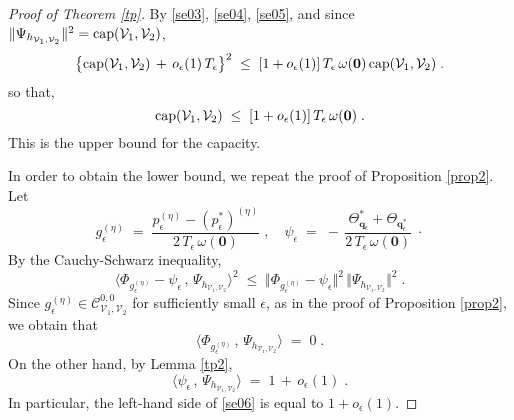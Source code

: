 \documentclass[reqno]{amsart}
\newcounter{as}[section]
\newcommand{\mc}[1]{{\mathcal #1}}
\newcommand{\bs}[1]{{\boldsymbol #1}}
\newcommand{\<}{\langle}
\renewcommand{\>}{\rangle}
\begin{document}
\begin{proof}[Proof of Theorem \ref{tp}]
By \eqref{se03}, \eqref{se04}, \eqref{se05}, and since $\Vert
\Psi_{h_{\mc{V}_{1},\mc{V}_{2}}} \Vert ^{2} =
\textup{cap}(\mc{V}_{1},\mc{V}_{2})$,
\begin{equation*}
\big\{ \textup{cap}(\mc{V}_{1},\mc{V}_{2}) \,+\,
o_{\epsilon}(1) \, T_{\epsilon}\big\}^{2} \;\le\;
[1+o_{\epsilon}(1)] \,T_{\epsilon} \,\omega(\bs{0})
\,\textup{cap}(\mc{V}_{1},\mc{V}_{2})\;.
\end{equation*}
so that,
\begin{equation*}
\textup{cap}(\mc{V}_{1},\mc{V}_{2})
\;\le\; [1+o_{\epsilon}(1)] \,T_{\epsilon}\, \omega(\bs{0})\;.
\end{equation*}
This is the upper bound for the capacity.

In order to obtain the lower bound, we repeat the proof of Proposition
\ref{prop2}. Let
\begin{equation*}
g_{\epsilon}^{(\eta)} \;=\;
\frac{p_{\epsilon}^{(\eta)}-(p_{\epsilon}^{*})^{(\eta)}}
{2\,T_{\epsilon}\,\omega(\bs{0})}\;,
\quad \psi_{\epsilon}\;=\; -\,
\frac{\Theta_{\bs{q}_{\epsilon}}^{*}+\Theta_{\bs{q}_{\epsilon}^{*}}}
{2\,T_{\epsilon}\,\omega(\bs{0})}\;\cdot
\end{equation*}
By the Cauchy-Schwarz inequality,
\begin{equation}
\label{se06}
\big\langle \Phi_{g_{\epsilon}^{(\eta)}} -\psi_{\epsilon} \,,\,
\Psi_{h_{\mc{V}_{1},\mc{V}_{2}}}\big\rangle ^{2}
\;\le\; \big\Vert \Phi_{g_{\epsilon}^{(\eta)}}
-\psi_{\epsilon} \big\Vert ^{2} \,
\Vert \Psi_{h_{\mc{V}_{1},\mc{V}_{2}}} \Vert ^{2}\;.
\end{equation}
Since $g_{\epsilon}^{(\eta)}\in\mc{C}_{\mc{V}_{1},\mc{V}_{2}}^{0,0}$ for
sufficiently small $\epsilon$, as in the proof of Proposition
\ref{prop2}, we obtain that
\begin{equation*}
\big\langle \Phi_{g_{\epsilon}^{(\eta)}} \,,\,
\Psi_{h_{\mc{V}_{1},\mc{V}_{2}}} \big\rangle \;=\;0\;.
\end{equation*}
On the other hand, by Lemma \ref{tp2},
\begin{equation*}
\langle \psi_{\epsilon} \,,\,\Psi_{h_{\mc{V}_{1},\mc{V}_{2}}}\rangle
\;=\; 1\,+\,o_{\epsilon}(1)\;.
\end{equation*}
In particular, the left-hand side of \eqref{se06} is equal to
$1+o_{\epsilon}(1)$.


\end{proof}
\end{document}
